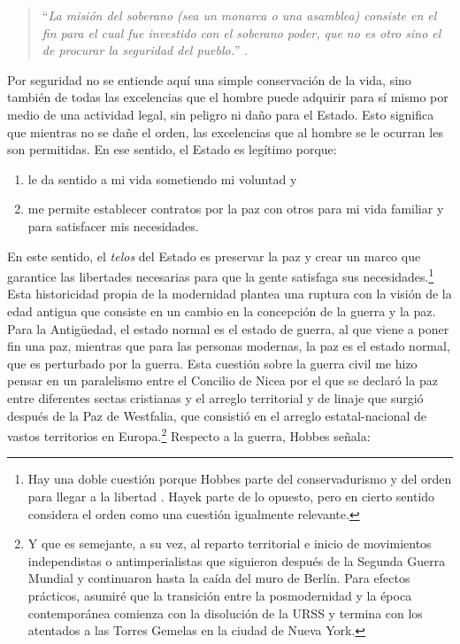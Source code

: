 \begin{quote}
  \enquote{\emph{La misión del soberano (sea un monarca o una asamblea) consiste
en el fin para el cual fue investido con el soberano poder, que no es
otro sino el de procurar la seguridad del pueblo.}} \autocite{hobbesLeviatan2007}.
\end{quote}

Por seguridad no se entiende aquí una simple conservación de la vida, sino también de todas las excelencias que el hombre puede adquirir para sí mismo por medio de una actividad legal, sin peligro ni daño para el Estado. Esto significa que mientras no se dañe el orden, las excelencias que al hombre se le ocurran les son permitidas. En ese sentido, el Estado es legítimo porque:
\begin{enumerate}
  \item le da sentido a mi vida sometiendo mi voluntad y
  \item me permite establecer contratos por la paz con otros para mi vida familiar y para satisfacer mis necesidades.
\end{enumerate}

En este sentido, el \emph{telos} del Estado es preservar la paz y crear un marco que garantice las libertades necesarias para que la gente satisfaga sus necesidades.\footnote{Hay una doble cuestión porque Hobbes parte del conservadurismo y del orden para llegar a la libertad \autocite[pp. 31-58]{tiqqunIntroduccionGuerraCivil2008}. Hayek parte de lo opuesto, pero en cierto sentido considera el orden como una cuestión igualmente relevante.} Esta historicidad propia de la modernidad plantea una ruptura con la visión de la edad antigua que consiste en un cambio en la concepción de la guerra y la paz. Para la Antigüedad, el estado normal es el estado de guerra, al que viene a poner fin una paz, mientras que para las personas modernas, la paz es el estado normal, que es perturbado por la guerra. Esta cuestión sobre la guerra civil me hizo pensar en un paralelismo entre el Concilio de Nicea por el que se declaró la paz entre diferentes sectas cristianas y el arreglo territorial y de linaje que surgió después de la Paz de Westfalia, que consistió en el arreglo estatal-nacional de vastos territorios en Europa.\footnote{Y que es semejante, a su vez, al reparto territorial e inicio de movimientos independistas o antimperialistas que siguieron después de la Segunda Guerra Mundial y continuaron hasta la caída del muro de Berlín. Para efectos prácticos, asumiré que la transición entre la posmodernidad y la época contemporánea comienza con la disolución de la URSS y termina con los atentados a las Torres Gemelas en la ciudad de Nueva York.} Respecto a la guerra, Hobbes señala:

